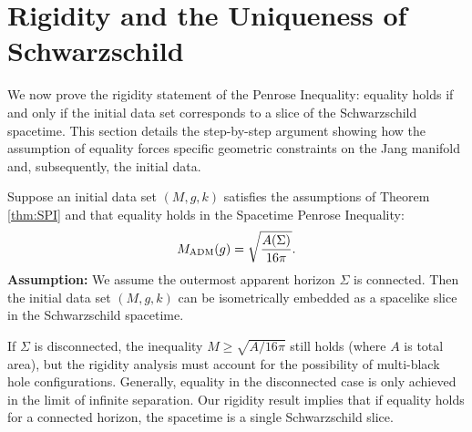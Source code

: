 \section{Rigidity and the Uniqueness of Schwarzschild}
\label{sec:Rigidity}

We now prove the rigidity statement of the Penrose Inequality: equality holds if and only if the initial data set corresponds to a slice of the Schwarzschild spacetime. This section details the step-by-step argument showing how the assumption of equality forces specific geometric constraints on the Jang manifold and, subsequently, the initial data.

\begin{theorem}
Suppose an initial data set $(M,g,k)$ satisfies the assumptions of Theorem \ref{thm:SPI} and that equality holds in the Spacetime Penrose Inequality:
\begin{equation}
    M_{\mathrm{ADM}}(g) = \sqrt{\frac{A(\Sigma)}{16\pi}}.
\end{equation}
\textbf{Assumption:} We assume the outermost apparent horizon $\Sigma$ is connected.
Then the initial data set $(M,g,k)$ can be isometrically embedded as a spacelike slice in the Schwarzschild spacetime.
\begin{remark}
If $\Sigma$ is disconnected, the inequality $M \ge \sqrt{A/16\pi}$ still holds (where $A$ is total area), but the rigidity analysis must account for the possibility of multi-black hole configurations. Generally, equality in the disconnected case is only achieved in the limit of infinite separation. Our rigidity result implies that if equality holds for a connected horizon, the spacetime is a single Schwarzschild slice.
\end{remark}
\end{theorem}
